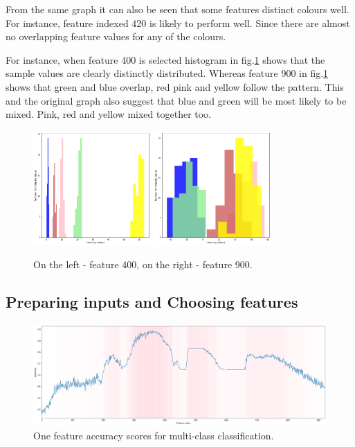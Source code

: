 \documentclass[11pt]{article}
\begin{document}
			From the same graph it can also be seen that some features distinct colours well. For instance, feature indexed 420 is likely to perform well. Since there are almost no overlapping feature values for any of the colours. 

			For instance, when feature 400 is selected histogram in fig.\ref{fig:400_900} shows that the sample values are clearly distinctly distributed. Whereas feature 900 in fig.\ref{fig:400_900} shows that green and blue overlap, red pink and yellow follow the pattern. This and the original graph also suggest that blue and green will be most likely to be mixed. Pink, red and yellow mixed together too. 

		\begin{figure}
			\hfill
				\includegraphics[width=0.4\textwidth]{png/400_multi.png}
			\hfill
				\includegraphics[width=0.4\textwidth]{png/900_multi.png}
			\hfill
			\caption{On the left - feature 400, on the right - feature 900.}
			\label{fig:400_900}
		\end{figure}

		\subsection{Preparing inputs and Choosing features}
			\begin{figure}[H]
				\includegraphics[width=1\textwidth]{png/multi_one}
				\caption{One feature accuracy scores for multi-class classification.}
				\label{fig:multi_one}
			\end{figure}
\end{document}
